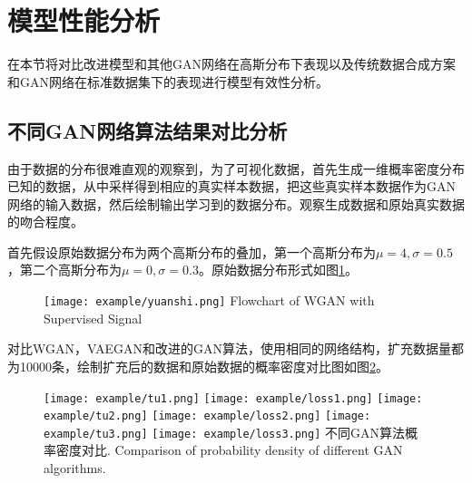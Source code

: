 \section{模型性能分析}
在本节将对比改进模型和其他GAN网络在高斯分布下表现以及传统数据合成方案和GAN网络在标准数据集下的表现进行模型有效性分析。
\subsection{不同GAN网络算法结果对比分析}
由于数据的分布很难直观的观察到，为了可视化数据，首先生成一维概率密度分布已知的数据，从中采样得到相应的真实样本数据，把这些真实样本数据作为GAN网络的输入数据，然后绘制输出学习到的数据分布。观察生成数据和原始真实数据的吻合程度。

首先假设原始数据分布为两个高斯分布的叠加，第一个高斯分布为$\mu=4,\sigma=0.5$，第二个高斯分布为$\mu=0,\sigma=0.3$。原始数据分布形式如图\ref{figyuanshi}。
\begin{figure}[htbp]
	\centering
	\texttt{[image: example/yuanshi.png]}
	{Flowchart of WGAN with Supervised Signal}
	\label{figyuanshi}
\end{figure}

对比WGAN，VAEGAN和改进的GAN算法，使用相同的网络结构，扩充数据量都为10000条，绘制扩充后的数据和原始数据的概率密度对比图如图\ref{fig:shiyan}。


\begin{figure}[htpb]
	\centering
	{\texttt{[image: example/tu1.png]}}
	\hspace{0.5em}
	{\texttt{[image: example/loss1.png]}}
	\newline
	\centering
	{\texttt{[image: example/tu2.png]}}
	\hspace{0.5em}
	{\texttt{[image: example/loss2.png]}}
	\newline
	\centering
	{\texttt{[image: example/tu3.png]}}
	\hspace{0.5em}
	{\texttt{[image: example/loss3.png]}}
	\bicaption
	{不同GAN算法概率密度对比.}
	{Comparison of probability density of different GAN algorithms.}
	\label{fig:shiyan}
\end{figure}



